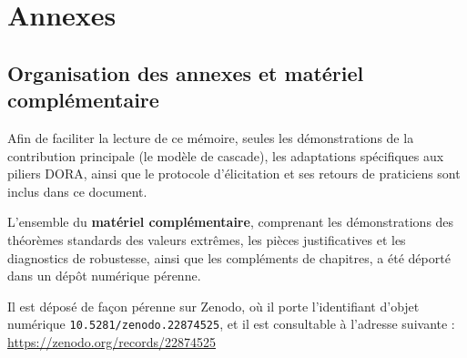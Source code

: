 \documentclass[12pt,a4paper]{report}
\begin{document}
\part*{Annexes}

\chapter*{Organisation des annexes et matériel complémentaire}

Afin de faciliter la lecture de ce mémoire, seules les démonstrations de la contribution
principale (le modèle de cascade), les adaptations spécifiques aux piliers DORA,
ainsi que le protocole d'élicitation et ses retours de praticiens sont inclus dans ce
document.

L'ensemble du \textbf{matériel complémentaire}, comprenant les démonstrations des théorèmes
standards des valeurs extrêmes, les pièces justificatives et les diagnostics de robustesse,
ainsi que les compléments de chapitres, a été déporté dans un dépôt numérique pérenne.

Il est déposé de façon pérenne sur Zenodo, où il porte l'identifiant d'objet numérique
\texttt{10.5281/zenodo.22874525}, et il est consultable à l'adresse suivante :
\url{https://zenodo.org/records/22874525}
\end{document}
